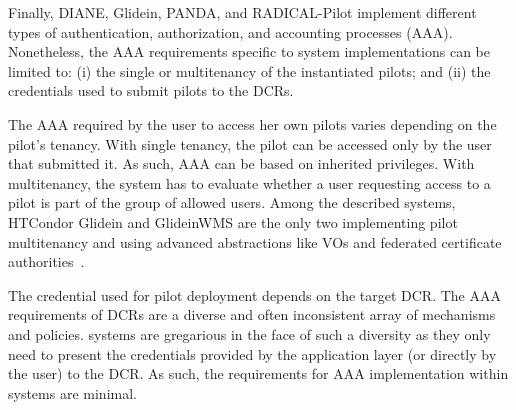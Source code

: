 \documentclass{sig-alternate}
\begin{document}

Finally, DIANE, Glidein, PANDA, and RADICAL-Pilot implement
different types of authentication, authorization, and accounting processes
(AAA). Nonetheless, the AAA requirements specific to \pilot system
implementations can be limited to: (i) the single or multitenancy of the
instantiated pilots; and (ii) the credentials used to submit pilots to the DCRs.

The AAA required by the user to access her own pilots varies depending on the
pilot's tenancy. With single tenancy, the pilot can be accessed only by the user
that submitted it. As such, AAA can be based on inherited privileges. With
multitenancy, the \pilot system has to evaluate whether a user requesting access
to a pilot is part of the group of allowed users. Among the described \pilot
systems, HTCondor Glidein and GlideinWMS are the only two implementing pilot
multitenancy and using advanced abstractions like VOs and federated certificate
authorities~\cite{horwitz2002}.

The credential used for pilot deployment depends on the target DCR. The AAA
requirements of DCRs are a diverse and often inconsistent array of mechanisms
and policies. \pilot systems are gregarious in the face of such a diversity as
they only need to present the credentials provided by the application layer (or
directly by the user) to the DCR. As such, the requirements for AAA
implementation within \pilot systems are minimal.



%


\end{document}
